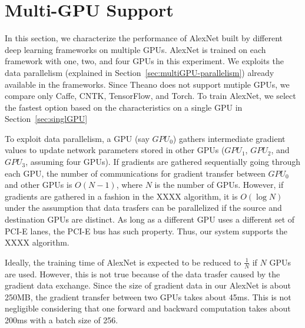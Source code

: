 \section{Multi-GPU Support}
\label{multi-GPU}
In this section, we characterize the performance of AlexNet built by different deep learning frameworks on multiple GPUs. AlexNet is trained on each framework with one, two, and four GPUs in this experiment. We exploits the data parallelism (explained in Section~\ref{sec:multiGPU-parallelism}) already available in the frameworks. Since Theano does not support mutiple GPUs, we compare only Caffe, CNTK, TensorFlow, and Torch. To train AlexNet, we select the fastest option based on the characteristics on a single GPU in Section~\ref{sec:singlGPU}

To exploit data parallelism, a GPU (say $GPU_0$) gathers intermediate gradient values to update network parameters stored in other GPUs ($GPU_1$, $GPU_2$, and $GPU_3$, assuming four GPUs). If gradients are gathered sequentially going through each GPU, the number of communications for gradient transfer between $GPU_0$ and other GPUs is $O(N-1)$, where $N$ is the number of GPUs. However, if gradients are gathered in a fashion in the XXXX algorithm\cite{}, it is $O(\log{N})$ under the assumption that data trasfers can be parallelized if the source and destination GPUs are distinct. As long as a different GPU uses a different set of PCI-E lanes, the PCI-E bus has such property. Thus, our system supports the XXXX algorithm.

Ideally, the training time of AlexNet is expected to be reduced to $\frac{1}{N}$ if $N$ GPUs are used. However, this is not true because of the data trasfer caused by the gradient data exchange.
Since the size of gradient data in our AlexNet is about 250MB, the gradient transfer between two GPUs takes about 45ms. This is not negligible considering that one forward and backward computation takes  about 200ms with a batch size of 256.

